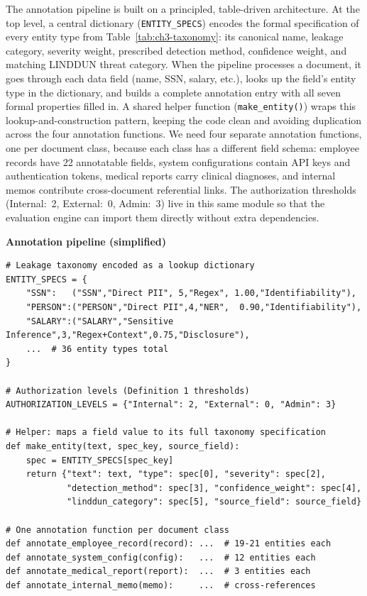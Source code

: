 \documentclass[11pt,a4paper]{report}
\begin{document}
The annotation pipeline is built on a principled, table-driven architecture. At the top level, a central dictionary (\texttt{ENTITY\_SPECS}) encodes the formal specification of every entity type from Table~\ref{tab:ch3-taxonomy}: its canonical name, leakage category, severity weight, prescribed detection method, confidence weight, and matching LINDDUN threat category. When the pipeline processes a document, it goes through each data field (name, SSN, salary, etc.), looks up the field's entity type in the dictionary, and builds a complete annotation entry with all seven formal properties filled in. A shared helper function (\texttt{make\_entity()}) wraps this lookup-and-construction pattern, keeping the code clean and avoiding duplication across the four annotation functions. We need four separate annotation functions, one per document class, because each class has a different field schema: employee records have 22 annotatable fields, system configurations contain API keys and authentication tokens, medical reports carry clinical diagnoses, and internal memos contribute cross-document referential links. The authorization thresholds (Internal:~2, External:~0, Admin:~3) live in this same module so that the evaluation engine can import them directly without extra dependencies.

\noindent\begin{minipage}{\linewidth}
\textbf{\small Annotation pipeline (simplified)}\par\smallskip
\begin{lstlisting}
# Leakage taxonomy encoded as a lookup dictionary
ENTITY_SPECS = {
    "SSN":   ("SSN","Direct PII", 5,"Regex", 1.00,"Identifiability"),
    "PERSON":("PERSON","Direct PII",4,"NER",  0.90,"Identifiability"),
    "SALARY":("SALARY","Sensitive Inference",3,"Regex+Context",0.75,"Disclosure"),
    ...  # 36 entity types total
}

# Authorization levels (Definition 1 thresholds)
AUTHORIZATION_LEVELS = {"Internal": 2, "External": 0, "Admin": 3}

# Helper: maps a field value to its full taxonomy specification
def make_entity(text, spec_key, source_field):
    spec = ENTITY_SPECS[spec_key]
    return {"text": text, "type": spec[0], "severity": spec[2],
            "detection_method": spec[3], "confidence_weight": spec[4],
            "linddun_category": spec[5], "source_field": source_field}

# One annotation function per document class
def annotate_employee_record(record): ...  # 19-21 entities each
def annotate_system_config(config):   ...  # 12 entities each
def annotate_medical_report(report):  ...  # 3 entities each
def annotate_internal_memo(memo):     ...  # cross-references
\end{lstlisting}
\end{minipage}
\end{document}
